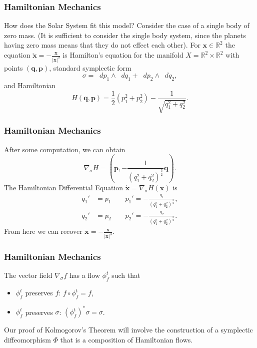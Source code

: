 \documentclass{beamer}
\newcommand{\R}{\mathbb{R}}
\newcommand{\bp}[1]{\bm{#1}}
\newcommand{\bd}[1]{\bm{\dot{#1}}}
\newcommand{\bdd}[1]{\bm{\ddot{#1}}}
\newcommand{\sgrad}{\nabla_{\sigma}}
\newcommand{\dif}{\mathop{}\!{d}}
\begin{document}

\begin{frame}
  \frametitle{Hamiltonian Mechanics}
  How does the Solar System fit this model?
  Consider the case of a single body of zero mass.
  (It is sufficient to consider the single body system, since the planets having
  zero mass means that they do not effect each other).
  For $\bp{x} \in \R^2$ the equation $\bdd{x} = -\frac{\bp{x}}{|\bp{x}|^3}$ is
  Hamilton's equation for the manifold $X = \R^2 \times \R^2$ with points
  $(\bp{q}, \bp{p})$, standard symplectic form
  \begin{equation*}
    \sigma = \dif p_1 \wedge \dif q_1 + \dif p_2 \wedge \dif q_2,
  \end{equation*}
  and Hamiltonian
  \begin{equation*}
    H(\bp{q}, \bp{p}) = \frac{1}{2} (p_1^2 + p_2^2) - \frac{1}{\sqrt{q_1^2 +
    q_2^2}}.
  \end{equation*}
\end{frame}

\begin{frame}
  \frametitle{Hamiltonian Mechanics}
  After some computation, we can obtain
  \begin{equation*}
    \sgrad H = \left( \bp{p}, -\frac{1}{(q_1^2 + q_2^2)^{\frac{3}{2}}} \bp{q}
    \right).
  \end{equation*}
  The Hamiltonian Differential Equation $\bd{x} = \sgrad H(\bp{x})$ is
  \begin{align*}
    q_1' &= p_1 \qquad p_1' = - \frac{q_1}{(q_1^2 + q_2^2)^{\frac{3}{2}}},\\
    q_2' &= p_2 \qquad p_2' = - \frac{q_2}{(q_1^2 + q_2^2)^{\frac{3}{2}}}.
  \end{align*}
  From here we can recover $\bdd{x} = -\frac{\bp{x}}{|\bp{x}|^3}$.
\end{frame}

\begin{frame}
  \frametitle{Hamiltonian Mechanics}
  The vector field $\sgrad f$ has a flow $\phi^t_f$ such that
  \begin{itemize}
  \item $\phi^t_f$ preserves $f$: $f \circ \phi^t_f = f$,
  \item $\phi^t_f$ preserves $\sigma$: $(\phi^t_f)^* \sigma = \sigma$.
  \end{itemize}

  Our proof of Kolmogorov's Theorem will involve the construction of a
  symplectic diffeomorphism $\Phi$ that is a composition of Hamiltonian flows.
\end{frame}
\end{document}
